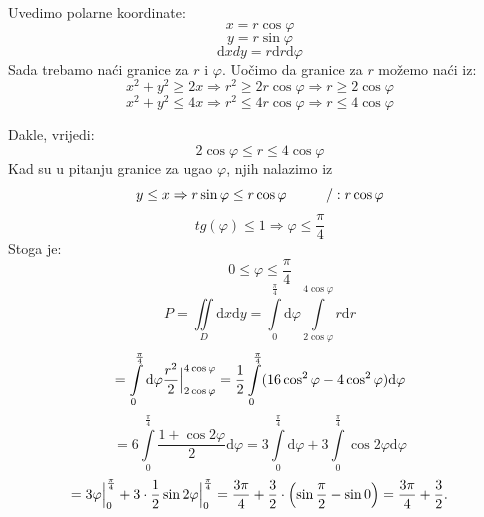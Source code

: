 \documentclass[a4paper,11pt]{article}
\begin{document}
Uvedimo polarne koordinate:
$$x = r \cos{\varphi}$$
$$y = r \sin{\varphi}$$
 $$\mathrm dxdy = r  \mathrm d r  \mathrm d\varphi$$
 Sada trebamo naći granice za $r$  i $\varphi.$ 
Uočimo da granice za $r$ možemo naći iz:  
$$x^{2} + y^{2} \geq 2x \Rightarrow r^{2}\geq 2 r\cos{\varphi}\Rightarrow r\geq 2 \cos{\varphi}$$
$$x^{2} + y^{2} \leq 4x \Rightarrow r^{2}\leq 4 r\cos{\varphi}\Rightarrow r\leq 4 \cos{\varphi}$$

Dakle, vrijedi:
$$ 2 \cos{\varphi} \leq r \leq 4\cos{\varphi} $$
Kad su u pitanju granice za ugao $\varphi$, njih nalazimo iz $$y\leq x \Rightarrow r\sin{\varphi} \leq r\cos{\varphi} \hspace{1 cm} / :r\cos{\varphi} $$
$$tg(\varphi) \leq 1 \Rightarrow \varphi \leq \frac{\pi}{4}$$
Stoga je:
$$ 0 \leq \varphi \leq \frac{\pi}{4} $$
$$P = \iint \limits_{D}   \mathrm dx \mathrm dy = \int\limits_{0}^{\frac{\pi}{4}} \mathrm d \varphi  \int\limits_{2\cos{\varphi}}^{4\cos{\varphi}} r\mathrm dr$$ 
$$= \int\limits_{0}^{\frac{\pi}{4}} \mathrm d \varphi  \frac{r^{2}}{2} \Big{|}_{2\cos{\varphi}}^{4\cos{\varphi}} = \frac{1}{2}\int\limits_{0}^{\frac{\pi}{4}} (16\cos^{2}{\varphi} - 4\cos^{2}{\varphi})  \mathrm d \varphi$$
$$   = 6\int\limits_{0}^{\frac{\pi}{4}}\frac{ 1 +\cos{2\varphi}}{2}  \mathrm d \varphi  =  3\int\limits_{0}^{\frac{\pi}{4}} \mathrm d \varphi  + 3\int\limits_{0}^{\frac{\pi}{4}}\cos{2\varphi} \mathrm d \varphi$$
$$= 3\varphi\Big{|}_{0}^{\frac{\pi}{4}} + 3\cdot \frac{1}{2}\sin{2\varphi}\Big{|}_{0}^{\frac{\pi}{4}} = \frac{3\pi}{4} +\frac{3}{2}\cdot\left(\sin{\frac{\pi}{2}} - \sin{0}\right)  = \frac{3\pi}{4} + \frac{3}{2} . $$
 
\end{document}
